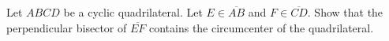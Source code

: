 Let $ABCD$ be a cyclic quadrilateral.
Let $E \in \overline{AB}$ and $F \in \overline{CD}$.
Show that the perpendicular bisector of $\overline{EF}$
contains the circumcenter of the quadrilateral.
